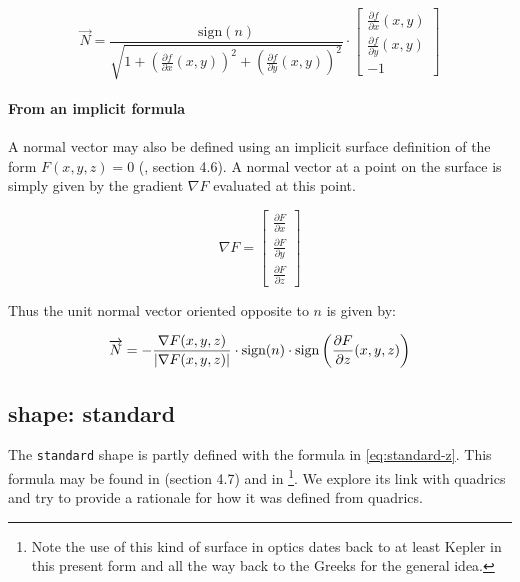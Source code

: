 \begin{equation} \label{eq:gen-normal}
\overrightarrow{N} =
\frac{\textrm{sign}(n)}
     {\sqrt{1 + \left(\frac{\partial f}{\partial x}(x, y)\right)^2 +
                \left(\frac{\partial f}{\partial y}(x, y)\right)^2}}
\cdot
\begin{bmatrix}
\frac{\partial f}{\partial x}(x, y) \\
\frac{\partial f}{\partial y}(x, y) \\
-1
\end{bmatrix}
\end{equation}

\paragraph{From an implicit formula}
A normal vector may also be defined using an implicit surface definition of
the form $F(x, y, z) = 0$ (\cite{wiki:normal}, \cite{Welford:1986} section 4.6).
A normal vector at a point on the surface is simply given by the gradient
$\nabla F$ evaluated at this point.

\begin{equation}
\nabla F =
\begin{bmatrix}
\frac{\partial F}{\partial x} \\
\frac{\partial F}{\partial y} \\
\frac{\partial F}{\partial z}
\end{bmatrix}
\end{equation}

Thus the unit normal vector oriented opposite to $n$ is given by:

\begin{equation}
\overrightarrow{N} = - \frac{\nabla F (x, y, z)}
                          {\abs{\nabla F(x, y, z)}} \cdot
  \textrm{sign}(n) \cdot
  \textrm{sign}\left(\frac{\partial F}{\partial z}(x, y, z)\right)
\end{equation}

\subsection{shape: standard}
The \lstinline{standard} shape is partly defined with the formula in
\cref{eq:standard-z}. This formula may be found in \cite{Welford:1986}
(section 4.7) and in \cite{Greynolds:2002} \footnote{Note the use of this kind
of surface in optics dates back to at least Kepler in this present form and all
the way back to the Greeks for the general idea.}.  We explore its link with
quadrics and try to provide a rationale for how it was defined from quadrics.

